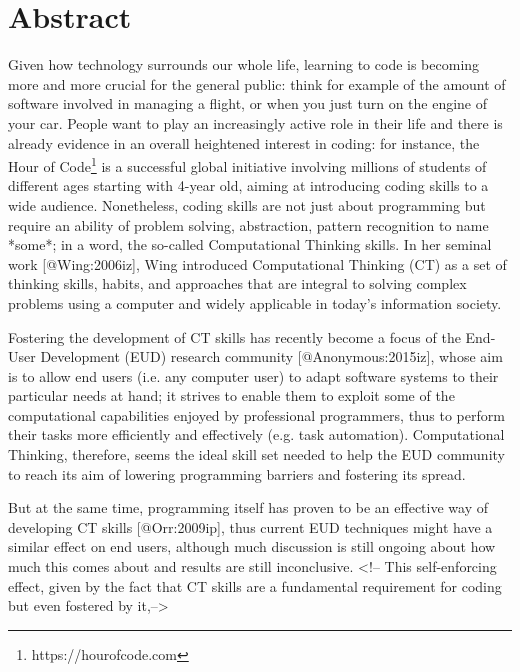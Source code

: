 %
\chapter*{Abstract}
\label{sec:abstract}
\vspace*{-10mm}

Given how technology surrounds our whole life, learning to code is becoming more and more crucial for the general public: think for example of the amount of software involved in managing a flight, or when you just turn on the engine of your car. People want to play an increasingly active role in their life and there is already evidence in an overall heightened interest in coding: for instance, the Hour of Code\footnote{https://hourofcode.com} is a successful global initiative involving millions of students of different ages starting with 4-year old, aiming at introducing coding skills to a wide audience. Nonetheless, coding skills are not just about programming but require an ability of problem solving, abstraction, pattern recognition to name *some*; in a word, the so-called Computational Thinking skills. In her seminal work [@Wing:2006iz], Wing introduced Computational Thinking (CT) as a set of thinking skills, habits, and approaches that are integral to solving complex problems using a computer and widely applicable in today's information society.

Fostering the development of CT skills has recently become a focus of the End-User Development (EUD) research community [@Anonymous:2015iz], whose aim is to allow end users (i.e. any computer user) to adapt software systems to their particular needs at hand; it strives to enable them to exploit some of the computational capabilities enjoyed by professional programmers, thus to perform their tasks more efficiently and effectively (e.g. task automation). Computational Thinking, therefore, seems the ideal skill set needed to help the EUD community to reach its aim of lowering programming barriers and fostering its spread.

But at the same time, programming itself has proven to be an effective way of developing CT skills [@Orr:2009ip], thus current EUD techniques might have a similar effect on end users, although much discussion is still ongoing about how much this comes about and results are still inconclusive. <!-- This self-enforcing effect, given by the fact that CT skills are a fundamental requirement for coding but even fostered by it,-->

